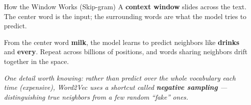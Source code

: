 \documentclass[aspectratio=169]{beamer}
\begin{document}
\begin{frame}{How the Window Works (Skip-gram)}
\vspace{0.3cm}
{\small A \textbf{context window} slides across the text. The center word is the input; the
surrounding words are what the model tries to predict.}

\medskip
\begin{center}
\end{center}

\medskip
{\small From the center word \textbf{milk}, the model learns to predict neighbors like
\textbf{drinks} and \textbf{every}. Repeat across billions of positions, and words sharing
neighbors drift together in the space.}

\medskip
{\small\textcolor{midgray}{\textit{One detail worth knowing: rather than predict over the whole
vocabulary each time (expensive), Word2Vec uses a shortcut called \textbf{negative sampling}
--- distinguishing true neighbors from a few random ``fake'' ones.}}}
\end{frame}
\end{document}
